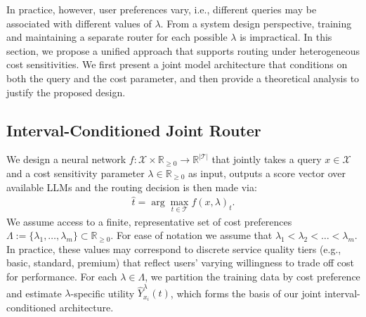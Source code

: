 \documentclass{article}
\theoremstyle{remark}
\begin{document}
In practice, however, user preferences vary, i.e., different queries may be associated with different values of $\lambda$. From a system design perspective, training and maintaining a separate router for each possible $\lambda$ is impractical. In this section, we propose a unified approach that supports routing under heterogeneous cost sensitivities. We first present a joint model architecture that conditions on both the query and the cost parameter, and then provide a theoretical analysis to justify the proposed design.



\subsection{Interval-Conditioned Joint Router}\label{sec:model_Setup}

We design a neural network $f : \mathcal{X} \times \mathbb{R}_{\geq 0} \to \mathbb{R}^{|\mathcal{T}|}$ that jointly takes a query $x \in \mathcal{X}$ and a cost sensitivity parameter $\lambda \in \mathbb{R}_{\geq 0}$ as input, outputs a score vector over available LLMs and the routing decision is then made via:\begin{align}
    \hat{t} = \arg\max_{t \in \mathcal{T}} f(x, \lambda)_t.
\end{align}
We assume access to a finite, representative set of cost preferences $\Lambda := \{\lambda_1, \dots, \lambda_m\} \subset \mathbb{R}_{\geq 0}$. For ease of notation we assume that $\lambda_1 < \lambda_2 < \dots < \lambda_m$. In practice, these values may correspond to discrete service quality tiers (e.g., basic, standard, premium) that reflect users’ varying willingness to trade off cost for performance.  
For each $\lambda \in \Lambda$, we partition the training data by cost preference and estimate $\lambda$-specific utility $\hat{Y}_{x_i}^{\lambda}(t)$, which forms the basis of our joint interval-conditioned architecture.
\end{document}
